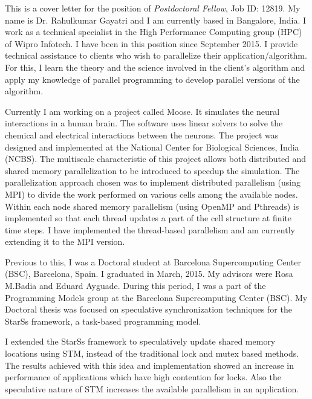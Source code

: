 \documentclass[10pt,stdletter,dateno]{newlfm}
\begin{document}
\begin{newlfm}
	   This is a cover letter for the position of {\it Postdoctoral Fellow}, Job ID: 12819. 
	   My name is Dr. Rahulkumar Gayatri and I am currently based in Bangalore, India. 
	   I work as a technical specialist in the High Performance Computing group (HPC) of Wipro Infotech. 
	   I have been in this position since September 2015. 
	   I provide technical assistance to clients who wish to parallelize their application/algorithm.
	   For this, I learn the theory and the science involved in the client's algorithm and apply my knowledge of parallel programming to develop parallel versions of the algorithm.
%	   
	   \par
	   Currently I am working on a project called Moose. It simulates the neural interactions in a human brain. 
	   The software uses linear solvers to solve the chemical and electrical interactions between the neurons. 
	   The project was designed and implemented at the National Center for Biological Sciences, India (NCBS). 
	   The multiscale characteristic of this project allows both distributed and shared memory parallelization to be introduced to speedup the simulation. 
	   The parallelization approach chosen was to implement distributed parallelism (using MPI) to divide the work performed on various cells among the available nodes. 
	   Within each node shared memory parallelism (using OpenMP and Pthreads) is implemented so that each thread updates a part of the cell structure at finite time steps.
	   I have implemented the thread-based parallelism and am currently extending it to the MPI version.
%	   
	   \par
	   Previous to this, I was a Doctoral student at Barcelona Supercomputing Center (BSC), Barcelona, Spain. I graduated in March, 2015. 
	   My advisors were Rosa M.Badia and Eduard Ayguade.  
	   During this period, I was a part of the Programming Models group at the Barcelona Supercomputing Center (BSC). 
	   My Doctoral thesis was focused on speculative synchronization techniques for the StarSs framework, a task-based programming model.
%
	   \par
	   I extended the StarSs framework to speculatively update shared memory locations using STM, instead of the traditional lock and mutex based methods.
	   The results achieved with this idea and implementation showed an increase in performance of applications which have high contention for locks. 
	   Also the speculative nature of STM increases the available parallelism in an application. 
%
	   \par

\end{newlfm}
\end{document}
